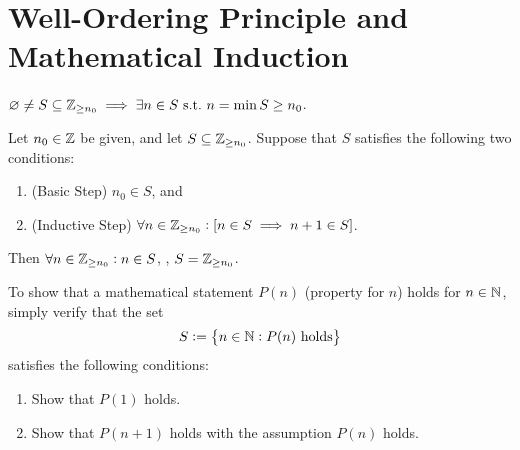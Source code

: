 \documentclass[11pt,openany]{article}
\begin{document}
\section{Well-Ordering Principle and Mathematical Induction}
\begin{remark*}
	\textcolor{gray!50}{$\varnothing\neq S\subseteq\mathbb{Z}_{\geq n_0}\implies\exists n\in S\ \text{s.t.}\ n=\min S\geq n_0$.}
\end{remark*}
\vfill
{}
\begin{remark*}
	\textcolor{gray!50}{Let $n_0\in\mathbb{Z}$ be given, and let $S\subseteq\mathbb{Z}_{\geq n_0}$. Suppose that $S$ satisfies the following two conditions: \begin{enumerate}
		\item (Basic Step) $n_0\in S$, and
		\item (Inductive Step) $\forall n\in\mathbb{Z}_{\geq n_0}: [n\in S\implies n+1\in S]$.
	\end{enumerate} Then $\forall n\in\mathbb{Z}_{\geq n_0}:n\in S$, \ie, $S=\mathbb{Z}_{\geq n_0}$.}
\end{remark*}
\vfill
\begin{remark*}
	To show that a mathematical statement $P(n)$ (property for $n$) holds for $n\in\mathbb{N}$, simply verify that the set \[
	S:=\set{n\in\N:P(n)\ \text{holds}}
	\] satisfies the following conditions: \begin{enumerate}
		\item Show that $P(1)$ holds.
		\item Show that $P(n+1)$ holds with the assumption $P(n)$ holds.
	\end{enumerate}
\end{remark*}
\end{document}
